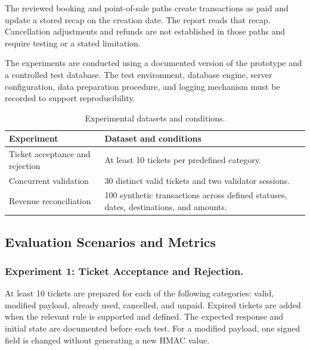 \documentclass[runningheads]{llncs}
\begin{document}
The reviewed booking and point-of-sale paths create transactions as
paid and update a stored recap on the creation date. The report reads
that recap. Cancellation adjustments and refunds are not established
in those paths and require testing or a stated limitation.

The experiments are conducted using a documented version of the
prototype and a controlled test database. The test environment,
database engine, server configuration, data preparation procedure,
and logging mechanism must be recorded to support reproducibility.

%

\begin{table}
\caption{Experimental datasets and conditions.}
\label{tab:experimental-conditions}
\centering
\begin{tabular}{|p{4.0cm}|p{5.0cm}|}
\hline
\textbf{Experiment} & \textbf{Dataset and conditions} \\
\hline
Ticket acceptance and rejection &
At least 10 tickets per predefined category. \\
\hline
Concurrent validation &
30 distinct valid tickets and two validator sessions. \\
\hline
Revenue reconciliation &
100 synthetic transactions across defined statuses, dates,
destinations, and amounts. \\
\hline
\end{tabular}
\end{table}

\subsection{Evaluation Scenarios and Metrics}

\subsubsection{Experiment 1: Ticket Acceptance and Rejection.}

At least 10 tickets are prepared for each of the following categories:
valid, modified payload, already used, cancelled, and unpaid.
Expired tickets are added when the relevant rule is supported and
defined. The expected response and initial state are documented
before each test. For a modified payload, one signed field is changed
without generating a new HMAC value.
\end{document}
